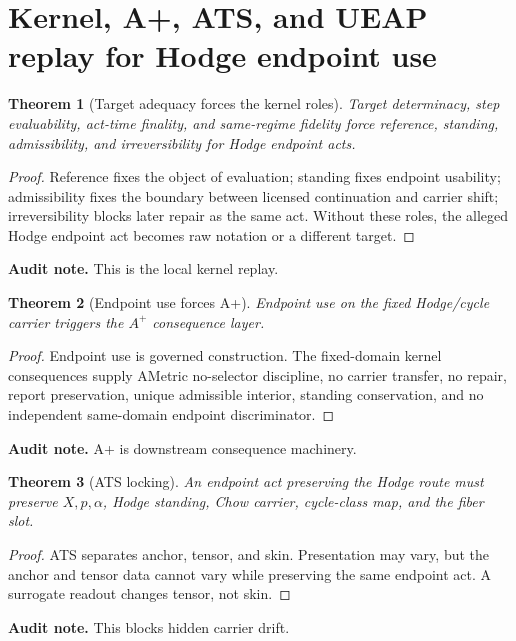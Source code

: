 \documentclass[11pt]{article}
\newtheorem{theorem}{Theorem}[section]
\begin{document}
\section{Kernel, A+, ATS, and UEAP replay for Hodge endpoint use}


\begin{theorem}[Target adequacy forces the kernel roles]
Target determinacy, step evaluability, act-time finality, and same-regime fidelity force reference, standing, admissibility, and irreversibility for Hodge endpoint acts.
\end{theorem}
\begin{proof}
Reference fixes the object of evaluation; standing fixes endpoint usability; admissibility fixes the boundary between licensed continuation and carrier shift; irreversibility blocks later repair as the same act. Without these roles, the alleged Hodge endpoint act becomes raw notation or a different target.
\end{proof}
\par\noindent\textbf{Audit note.} This is the local kernel replay.


\begin{theorem}[Endpoint use forces A+]
Endpoint use on the fixed Hodge/cycle carrier triggers the $A^+$ consequence layer.
\end{theorem}
\begin{proof}
Endpoint use is governed construction. The fixed-domain kernel consequences supply AMetric no-selector discipline, no carrier transfer, no repair, report preservation, unique admissible interior, standing conservation, and no independent same-domain endpoint discriminator.
\end{proof}
\par\noindent\textbf{Audit note.} A+ is downstream consequence machinery.


\begin{theorem}[ATS locking]
An endpoint act preserving the Hodge route must preserve $X,p,\alpha$, Hodge standing, Chow carrier, cycle-class map, and the fiber slot.
\end{theorem}
\begin{proof}
ATS separates anchor, tensor, and skin. Presentation may vary, but the anchor and tensor data cannot vary while preserving the same endpoint act. A surrogate readout changes tensor, not skin.
\end{proof}
\par\noindent\textbf{Audit note.} This blocks hidden carrier drift.
\end{document}
